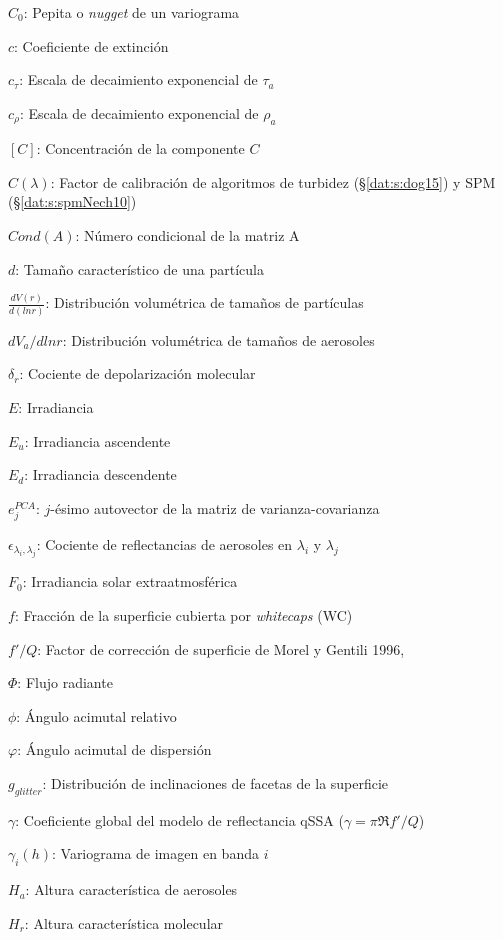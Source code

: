 {$C_{0}$: Pepita o \textit{nugget} de un variograma

$c$: Coeficiente de extinción

$c_{\tau}$: Escala de decaimiento exponencial de $\tau_{a}$

$c_{\rho}$: Escala de decaimiento exponencial de $\rho_{a}$

$[C]$: Concentración de la componente $C$

$C(\lambda)$:  Factor de calibración de algoritmos de turbidez (\S \ref{dat:s:dog15}) y SPM (\S \ref{dat:s:spmNech10})

$Cond(A)$: Número condicional de la matriz A

$d$: Tamaño característico de una partícula

$\frac{dV(r)}{d(lnr)}$: Distribución volumétrica de tamaños de partículas

$dV_{a}/dlnr$: Distribución volumétrica de tamaños de aerosoles

$\delta_{r}$: Cociente de depolarización molecular

$E$: Irradiancia

$E_{u}$: Irradiancia ascendente

$E_{d}$: Irradiancia descendente

$e^{PCA}_{j}$: $j$-ésimo autovector de la matriz de varianza-covarianza

$\epsilon_{\lambda_{i},\lambda_{j}}$: Cociente de reflectancias de aerosoles en $\lambda_{i}$ y $\lambda_{j}$

$F_{0}$: Irradiancia solar extraatmosférica

$f$: Fracción de la superficie cubierta por \textit{whitecaps} (WC)

$f'/Q$: Factor de corrección de superficie de Morel y Gentili 1996, \cite{morel1996}

$\Phi$: Flujo radiante

$\phi$: Ángulo acimutal relativo

$\varphi$: Ángulo acimutal de dispersión

$g_{glitter}$: Distribución de inclinaciones de facetas de la superficie

$\gamma$: Coeficiente global del modelo de reflectancia qSSA ($\gamma = \pi \Re f'/Q$)

$\gamma_{i}(h)$: Variograma de imagen en banda $i$

$H_{a}$: Altura característica de aerosoles

$H_{r}$: Altura característica molecular

}
